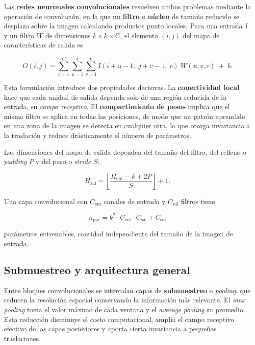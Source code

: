 Las \textbf{redes neuronales convolucionales} \citep{lecun1998} resuelven
ambos problemas mediante la operación de convolución, en la que un
\textbf{filtro} o \textbf{núcleo} de tamaño reducido se desplaza sobre la
imagen calculando productos punto locales. Para una entrada $I$ y un filtro
$W$ de dimensiones $k \times k \times C$, el elemento $(i,j)$ del mapa de
características de salida es

\begin{equation}
O(i,j) = \sum_{c=1}^{C} \sum_{u=1}^{k} \sum_{v=1}^{k} I(i+u-1,\; j+v-1,\; c)\; W(u,v,c) \;+\; b.
\label{eq:convolucion}
\end{equation}

Esta formulación introduce dos propiedades decisivas. La
\textbf{conectividad local} hace que cada unidad de salida dependa solo de
una región reducida de la entrada, su \textit{campo receptivo}. El
\textbf{compartimiento de pesos} implica que el mismo filtro se aplica en
todas las posiciones, de modo que un patrón aprendido en una zona de la
imagen se detecta en cualquier otra, lo que otorga invariancia a la
traslación y reduce drásticamente el número de parámetros.

Las dimensiones del mapa de salida dependen del tamaño del filtro, del
relleno o \textit{padding} $P$ y del paso o \textit{stride} $S$:

\begin{equation}
H_{\text{sal}} = \left\lfloor \frac{H_{\text{ent}} - k + 2P}{S} \right\rfloor + 1.
\label{eq:dimensiones}
\end{equation}

Una capa convolucional con $C_{\text{ent}}$ canales de entrada y
$C_{\text{sal}}$ filtros tiene

\begin{equation}
n_{\text{par}} = k^{2} \cdot C_{\text{ent}} \cdot C_{\text{sal}} + C_{\text{sal}}
\label{eq:parametros}
\end{equation}

\noindent parámetros entrenables, cantidad independiente del tamaño de la
imagen de entrada.

\subsection{Submuestreo y arquitectura general}

Entre bloques convolucionales se intercalan capas de \textbf{submuestreo} o
\textit{pooling}, que reducen la resolución espacial conservando la
información más relevante. El \textit{max pooling} toma el valor máximo de
cada ventana y el \textit{average pooling} su promedio. Esta reducción
disminuye el costo computacional, amplía el campo receptivo efectivo de las
capas posteriores y aporta cierta invariancia a pequeñas traslaciones.

